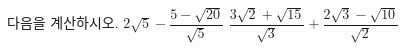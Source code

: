 다음을 계산하시오.
 $2\sqrt{5}-\dfrac{5-\sqrt{20}}{\sqrt{5}}$
 $\dfrac{3\sqrt{2}+\sqrt{15}}{\sqrt{3}}+\dfrac{2\sqrt{3}-\sqrt{10}}{\sqrt{2}}$
